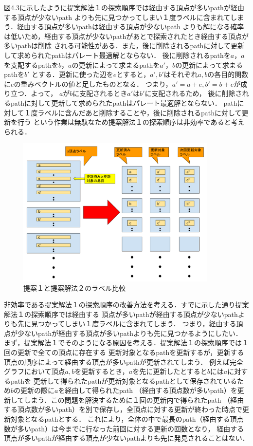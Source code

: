 \documentclass[12pt]{optlab-bachelor}
\begin{document}
図4.3に示したように提案解法１の探索順序では経由する頂点が多いpathが経由する頂点が少ないpath
よりも先に見つかってしまい１度ラベルに含まれてしまう．経由する頂点が多いpathは経由する頂点が少ないpath
よりも解になる確率は低いため，経由する頂点が少ないpathがあとで探索されたとき経由する頂点が多いpathは削除
される可能性がある．また，後に削除されるpathに対して更新して求められたpathはパレート最適解とならない．
後に削除されるpathを$a$，$a$を支配するpathを$b$，$a$の更新によって求まるpathを$a'$，$b$の更新によって求まるpathを$b'$
とする．更新に使った辺を$e$とすると，$a',b'$はそれぞれ$a,b$の各目的関数に$e$の重みベクトルの値と足したものとなる．
つまり，$a'=a+e,b'=b+e$が成り立つ．よって， $a$が$b$に支配されるとき$a'$は$b'$に支配されるため，
後に削除されるpathに対して更新して求められたpathはパレート最適解とならない．
pathに対して１度ラベルに含んだあと削除することや，後に削除されるpathに対して更新を行う
という作業は無駄なため提案解法１の探索順序は非効率であると考えられる．

\begin{figure}[htbp]
  \centering
  \caption{提案１と提案解法２のラベル比較}
  \includegraphics[width=10.0cm]{fig/fig8.pdf}
\end{figure}

非効率である提案解法１の探索順序の改善方法を考える．すでに示した通り提案解法１の探索順序では経由する
頂点が多いpathが経由する頂点が少ないpathよりも先に見つかってしまい１度ラベルに含まれてしまう．
つまり，経由する頂点が少ないpathが経由する頂点が多いpathよりも先に見つかるようにしたい．
まず，提案解法１でそのようになる原因を考える．提案解法１の探索順序では１回の更新で全ての頂点に存在する
更新対象となるpathを更新するが，更新する頂点の順序によって経由する頂点が多いpathが更新されてしまう．
例えば完全グラフにおいて頂点$a,b$を更新するとき，$a$を先に更新したとすると$b$には$a$に対するpathを
更新して得られたpathが更新対象となるpathとして保存されているため$b$の更新の際に$a$を経由して得られたpath
（経由する頂点数が多いpath）を更新してしまう．この問題を解決するために１回の更新内で得られたpath
（経由する頂点数が多いpath）を別で保存し，全頂点に対する更新が終わった時点で更新対象となるpathとする．
これにより，全体の中で最長のpath（経由する頂点数が多いpath）は今までに行なった前回に対する更新の回数となり，
経由する頂点が多いpathが経由する頂点が少ないpathよりも先に発見されることはない．
\end{document}
